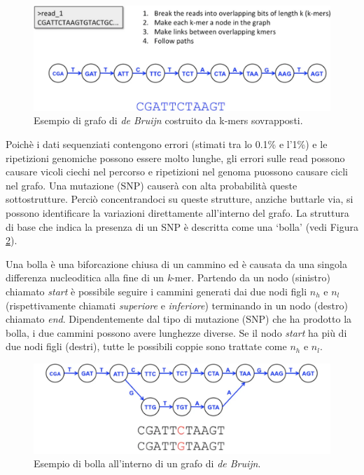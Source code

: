 \documentclass[../main.tex]{subfiles}
\begin{document}
\begin{figure}[h!]
	\centering
  	\captionsetup{justification=centering}
  	\includegraphics[scale=.3]{images/dBG.png}
  	\caption{Esempio di grafo di \textit{de Bruijn} costruito da k-mers sovrapposti.}
  	\label{fig:dBG}
\end{figure}

\noindent
Poichè i dati sequenziati contengono errori (stimati tra lo 0.1\% e l'1\%) e le ripetizioni genomiche possono essere molto lunghe, gli errori sulle read possono causare vicoli ciechi nel percorso e ripetizioni nel genoma puossono causare cicli nel grafo. Una mutazione (SNP) causerà con alta probabilità queste sottostrutture. Perciò concentrandoci su queste strutture, anziche buttarle via, si possono identificare la variazioni direttamente all'interno del grafo. La struttura di base che indica la presenza di un SNP è descritta come una `bolla' (vedi Figura \ref{fig:dBG_bubble}).

\begin{definition}
Una bolla è una biforcazione chiusa di un cammino ed è causata da una singola differenza nucleoditica alla fine di un \textit{k}-mer. Partendo da un nodo (sinistro) chiamato \textit{start} è possibile seguire i cammini generati dai due nodi figli $n_h$ e $n_l$ (rispettivamente chiamati \textit{superiore} e \textit{inferiore}) terminando in un nodo (destro) chiamato \textit{end}. Dipendentemente dal tipo di mutazione (SNP) che ha prodotto la bolla, i due cammini possono avere lunghezze diverse. Se il nodo \textit{start} ha più di due nodi figli (destri), tutte le possibili coppie sono trattate come $n_h$ e $n_l$.
\end{definition}

\begin{figure}[h!]
	\centering
  	\captionsetup{justification=centering}
  	\includegraphics[scale=.3]{images/dBG_bubble.png}
  	\caption{Esempio di bolla all'interno di un grafo di \textit{de Bruijn}.}
  	\label{fig:dBG_bubble}
\end{figure}
\end{document}

